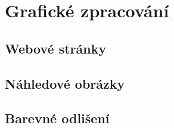 \chapter{Grafické zpracování}
\large {}

\section{Webové stránky}

\section{Náhledové obrázky}

\section{Barevné odlišení}